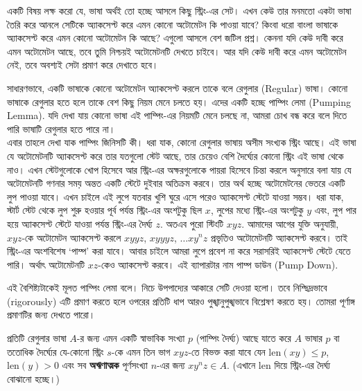 \vspace*{-2em}
একটি বিষয় লক্ষ করো যে, ভাষা অর্থই তো হচ্ছে আসলে কিছু স্ট্রিং-এর সেট। এখন কেউ তার মনমতো একটা ভাষা তৈরি করে আনলে সেটিকে অ্যাকসেপ্ট করে এমন কোনো অটোমেটন কি পাওয়া যাবে? কিংবা ধরো বাংলা ভাষাকে অ্যাকসেপ্ট করে এমন কোনো অটোমেটন কি আছে? এগুলো আসলে বেশ জটিল প্রশ্ন। কেননা যদি কেউ দাবী করে এমন অটোমেটন আছে, তবে তুমি নিশ্চয়ই অটোমেটনটি দেখতে চাইবে। আর যদি কেউ দাবী করে এমন অটোমেটন নেই, তবে অবশ্যই সেটা প্রমাণ করে দেখাতে হবে। 

সাধারণভাবে, একটি ভাষাকে কোনো অটোমেটন অ্যাকসেপ্ট করলে তাকে বলে রেগুলার (Regular) ভাষা। কোনো ভাষাকে রেগুলার হতে হলে তাকে বেশ কিছু নিয়ম মেনে চলতে হয়। এদের একটি হচ্ছে পাম্পিং লেমা (Pumping Lemma). যদি দেখা যায় কোনো ভাষা এই পাম্পিং-এর নিয়মটি মেনে চলছে না, আমরা চোখ বন্ধ করে বলে দিতে পারি ভাষাটি রেগুলার হতে পারে না।\\[2pt]
এবার তাহলে দেখা যাক পাম্পিং জিনিসটি কী। ধরা যাক, কোনো রেগুলার ভাষায় অসীম সংখ্যক স্ট্রিং আছে। এই ভাষা যে অটোমেটনটি অ্যাকসেপ্ট করে তার যতগুলো স্টেট আছে, তার চেয়েও বেশি দৈর্ঘ্যের কোনো স্ট্রিং এই ভাষা থেকে নাও। এখন স্টেটগুলোকে খোপ হিসেবে আর স্ট্রিং-এর অক্ষরগুলোকে পায়রা হিসেবে চিন্তা করলে \phpname{} অনুসারে বলা যায় যে অটোমেটনটি গণনার সময় অন্তত একটি স্টেটে দুইবার অতিক্রম করবে। তার অর্থ হচ্ছে অটোমেটনের ভেতরে একটি লুপ পাওয়া যাবে। এখন চাইলে এই লুপে যতবার খুশি ঘুরে এসে পরেও অ্যাকসেপ্ট স্টেটে যাওয়া সম্ভব। ধরা যাক, স্টার্ট স্টেট থেকে লুপ শুরু হওয়ার পূর্ব পর্যন্ত স্ট্রিং-এর অংশটুকু ছিল $x$, লুপের মধ্যে স্ট্রিং-এর অংশটুকু $y$ এবং, লুপ পার হয়ে অ্যাকসেপ্ট স্টেটে যাওয়া পর্যন্ত স্ট্রিং-এর দৈর্ঘ্য $z$. অতএব পুরো স্টিংটি $xyz$. আমাদের আগের যুক্তি অনুযায়ী, $xyz$-কে অটোমেটন অ্যাকসেপ্ট করলে $xyyz$, $xyyyz$, $\ldots xy^nz$ প্রভৃতিও অটোমেটনটি অ্যাকসেপ্ট করবে। তাই স্ট্রিং-এর অংশবিশেষ `পাম্প' করা যাবে। আবার চাইলে আমরা লুপে প্রবেশ না করে সরাসরিই অ্যাকসেপ্ট স্টেটে যেতে পারি। অর্থাৎ অটোমেটনটি $xz$-কেও অ্যাকসেপ্ট করবে। এই ব্যাপারটার নাম পাম্প ডাউন (Pump Down). 

এই বৈশিষ্ট্যটাকেই মূলত পাম্পিং লেমা বলে। নিচে উপপাদ্যের আকারে সেটি দেওয়া হলো। তবে নিশ্ছিদ্রভাবে (rigorously) এটি প্রমাণ করতে হলে ওপরের প্রতিটি ধাপ আরও পুঙ্খানুপুঙ্খভাবে বিশ্লেষণ করতে হয়। তোমরা পূর্ণাঙ্গ প্রমাণটির জন্য \cite{sipser13} দেখতে পারো।

\begin{theorem}[পাম্পিং লেমা]
	প্রতিটি রেগুলার ভাষা $A$-র জন্য এমন একটি স্বাভাবিক সংখ্যা $p$ (পাম্পিং দৈর্ঘ্য) আছে যাতে করে $A$ ভাষার $p$ বা ততোধিক দৈর্ঘ্যের যে-কোনো স্ট্রিং $s$-কে এমন তিন ভাগ $xyz$-তে বিভক্ত করা যাবে যেন $\text{len}(xy)\leq p$, $\text{len}(y)>0$ এবং সব \textbf{অঋণাত্মক} পূর্ণসংখ্যা $n$-এর জন্য $xy^nz\in A$. (এখানে len দিয়ে স্ট্রিং-এর দৈর্ঘ্য বোঝানো হচ্ছে।)
\end{theorem}


